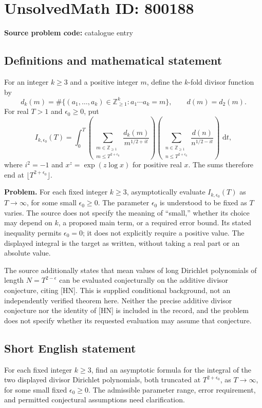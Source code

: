 \documentclass[11pt]{article}
\newcommand{\Z}{\mathbb{Z}}
\newcommand{\dd}{\,\mathrm{d}}
\begin{document}
\section*{UnsolvedMath ID: 800188}
\textbf{Source problem code:} catalogue entry
\subsection{Definitions and mathematical statement}
For an integer \(k\geq 3\) and a positive integer \(m\), define the \(k\)-fold divisor function by
\[
d_k(m)=\#\{(a_1,\ldots,a_k)\in\Z_{\geq1}^{k}:a_1\cdots a_k=m\},
\qquad d(m)=d_2(m).
\]
For real \(T>1\) and \(\epsilon_0\geq0\), put
\[
I_{k,\epsilon_0}(T)=\int_0^T
\left(\sum_{\substack{m\in\Z_{\geq1}\\m\leq T^{2+\epsilon_0}}}\frac{d_k(m)}{m^{1/2+it}}\right)
\left(\sum_{\substack{n\in\Z_{\geq1}\\n\leq T^{2+\epsilon_0}}}\frac{d(n)}{n^{1/2-it}}\right)\,\dd t,
\]
where \(i^2=-1\) and \(x^z=\exp(z\log x)\) for positive real \(x\). The sums therefore end at \(\lfloor T^{2+\epsilon_0}\rfloor\).

\textbf{Problem.} For each fixed integer \(k\geq3\), asymptotically evaluate \(I_{k,\epsilon_0}(T)\) as \(T\to\infty\), for some small \(\epsilon_0\geq0\). The parameter \(\epsilon_0\) is understood to be fixed as \(T\) varies. The source does not specify the meaning of ``small,'' whether its choice may depend on \(k\), a proposed main term, or a required error bound. Its stated inequality permits \(\epsilon_0=0\); it does not explicitly require a positive value. The displayed integral is the target as written, without taking a real part or an absolute value.

The source additionally states that mean values of long Dirichlet polynomials of length \(N=T^{2-\epsilon}\) can be evaluated conjecturally on the additive divisor conjecture, citing [HN]. This is supplied conditional background, not an independently verified theorem here. Neither the precise additive divisor conjecture nor the identity of [HN] is included in the record, and the problem does not specify whether its requested evaluation may assume that conjecture.
\subsection{Short English statement}
For each fixed integer \(k\geq3\), find an asymptotic formula for the integral of the two displayed divisor Dirichlet polynomials, both truncated at \(T^{2+\epsilon_0}\), as \(T\to\infty\), for some small fixed \(\epsilon_0\geq0\). The admissible parameter range, error requirement, and permitted conjectural assumptions need clarification.
\end{document}
